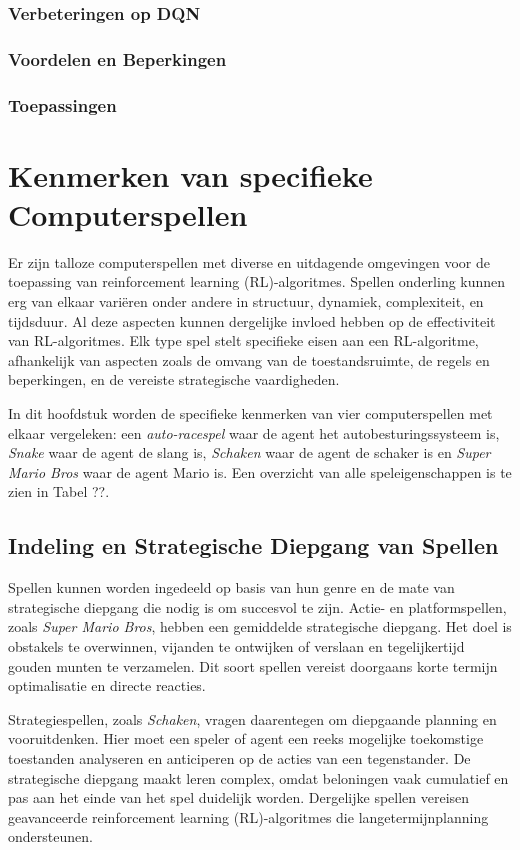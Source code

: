 \documentclass[a4paper,12pt]{report}
\begin{document}
\subsection{Verbeteringen op DQN}

\subsection{Voordelen en Beperkingen}

\subsection{Toepassingen}

\chapter{Kenmerken van specifieke Computerspellen}
Er zijn talloze computerspellen met diverse en uitdagende omgevingen voor de
toepassing van reinforcement learning (RL)-algoritmes. Spellen onderling kunnen
erg van elkaar variëren onder andere in structuur, dynamiek, complexiteit, en
tijdsduur. Al deze aspecten kunnen dergelijke invloed hebben op de
effectiviteit van RL-algoritmes. Elk type spel stelt specifieke eisen aan een
RL-algoritme, afhankelijk van aspecten zoals de omvang van de toestandsruimte,
de regels en beperkingen, en de vereiste strategische vaardigheden.

In dit hoofdstuk worden de specifieke kenmerken van vier computerspellen met
elkaar vergeleken: een \textit{auto-racespel} waar de agent het
autobesturingssysteem is, \textit{Snake} waar de agent de slang is,
\textit{Schaken} waar de agent de schaker is en \textit{Super Mario Bros} waar
de agent Mario is. Een overzicht van alle speleigenschappen is te zien in Tabel
??.

\section{Indeling en Strategische Diepgang van Spellen} Spellen kunnen worden ingedeeld op basis van hun genre en de mate van
strategische diepgang die nodig is om succesvol te zijn. Actie- en
platformspellen, zoals \textit{Super Mario Bros}, hebben een gemiddelde
strategische diepgang. Het doel is obstakels te overwinnen, vijanden te
ontwijken of verslaan en tegelijkertijd gouden munten te verzamelen. Dit soort
spellen vereist doorgaans korte termijn optimalisatie en directe reacties.

Strategiespellen, zoals \textit{Schaken}, vragen daarentegen om diepgaande
planning en vooruitdenken. Hier moet een speler of agent een reeks mogelijke
toekomstige toestanden analyseren en anticiperen op de acties van een
tegenstander. De strategische diepgang maakt leren complex, omdat beloningen
vaak cumulatief en pas aan het einde van het spel duidelijk worden. Dergelijke
spellen vereisen geavanceerde reinforcement learning (RL)-algoritmes die
langetermijnplanning ondersteunen.
\end{document}

